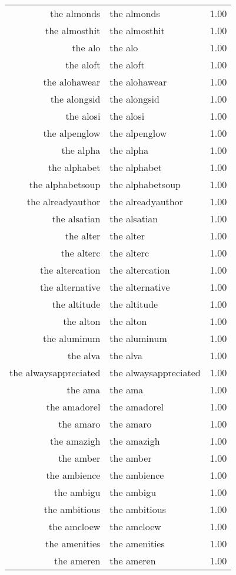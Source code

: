 \begin{table}[ht]
\begin{tabular}{rlr}
  the almonds & the almonds & 1.00 \\ 
  the almosthit & the almosthit & 1.00 \\ 
  the alo & the alo & 1.00 \\ 
  the aloft & the aloft & 1.00 \\ 
  the alohawear & the alohawear & 1.00 \\ 
  the alongsid & the alongsid & 1.00 \\ 
  the alosi & the alosi & 1.00 \\ 
  the alpenglow & the alpenglow & 1.00 \\ 
  the alpha & the alpha & 1.00 \\ 
  the alphabet & the alphabet & 1.00 \\ 
  the alphabetsoup & the alphabetsoup & 1.00 \\ 
  the alreadyauthor & the alreadyauthor & 1.00 \\ 
  the alsatian & the alsatian & 1.00 \\ 
  the alter & the alter & 1.00 \\ 
  the alterc & the alterc & 1.00 \\ 
  the altercation & the altercation & 1.00 \\ 
  the alternative & the alternative & 1.00 \\ 
  the altitude & the altitude & 1.00 \\ 
  the alton & the alton & 1.00 \\ 
  the aluminum & the aluminum & 1.00 \\ 
  the alva & the alva & 1.00 \\ 
  the alwaysappreciated & the alwaysappreciated & 1.00 \\ 
  the ama & the ama & 1.00 \\ 
  the amadorel & the amadorel & 1.00 \\ 
  the amaro & the amaro & 1.00 \\ 
  the amazigh & the amazigh & 1.00 \\ 
  the amber & the amber & 1.00 \\ 
  the ambience & the ambience & 1.00 \\ 
  the ambigu & the ambigu & 1.00 \\ 
  the ambitious & the ambitious & 1.00 \\ 
  the amcloew & the amcloew & 1.00 \\ 
  the amenities & the amenities & 1.00 \\ 
  the ameren & the ameren & 1.00 \\ 

\end{tabular}
\end{table}
